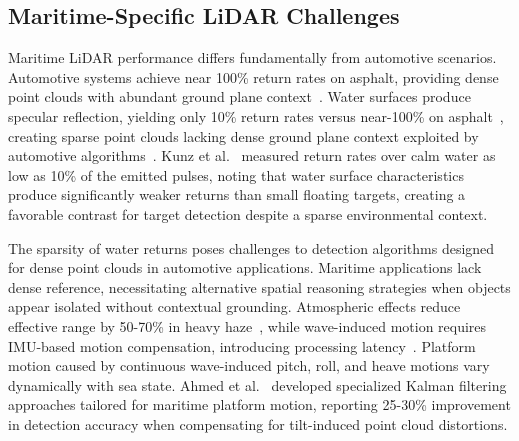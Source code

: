 \documentclass{erauthesis}
\begin{document}
\subsection{Maritime-Specific LiDAR Challenges}

Maritime \ac{LiDAR} performance differs fundamentally from automotive scenarios.
Automotive systems achieve near 100\% return rates on asphalt, providing dense point clouds with abundant ground plane context~\cite{roriz2022}.
Water surfaces produce specular reflection, yielding only 10\% return rates versus near-100\% on asphalt~\cite{kunz2005, roriz2022}, creating sparse point clouds lacking dense ground plane context exploited by automotive algorithms~\cite{zhou2018, shi2019}.
Kunz et al.~\cite{kunz2005} measured return rates over calm water as low as 10\% of the emitted pulses, noting that water surface characteristics produce significantly weaker returns than small floating targets, creating a favorable contrast for target detection despite a sparse environmental context.

The sparsity of water returns poses challenges to detection algorithms designed for dense point clouds in automotive applications.
Maritime applications lack dense reference, necessitating alternative spatial reasoning strategies when objects appear isolated without contextual grounding.
Atmospheric effects reduce effective range by 50-70\% in heavy haze~\cite{roriz2022}, while wave-induced motion requires IMU-based motion compensation, introducing processing latency~\cite{xie2024, ahmed2024}.
Platform motion caused by continuous wave-induced pitch, roll, and heave motions vary dynamically with sea state.
Ahmed et al.~\cite{ahmed2024} developed specialized Kalman filtering approaches tailored for maritime platform motion, reporting 25-30\% improvement in detection accuracy when compensating for tilt-induced point cloud distortions.
\end{document}
